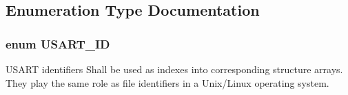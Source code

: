 \subsection{Enumeration Type Documentation}
\subsubsection[{\texorpdfstring{U\+S\+A\+R\+T\+\_\+\+ID}{USART_ID}}]{\setlength{\rightskip}{0pt plus 5cm}enum {\bf U\+S\+A\+R\+T\+\_\+\+ID}}\hypertarget{group__usart_async_module_gaae3c5ea77a411e5f40e4377f77067b86}{}\label{group__usart_async_module_gaae3c5ea77a411e5f40e4377f77067b86}


U\+S\+A\+RT identifiers Shall be used as indexes into corresponding structure arrays. They play the same role as file identifiers in a Unix/\+Linux operating system. 

